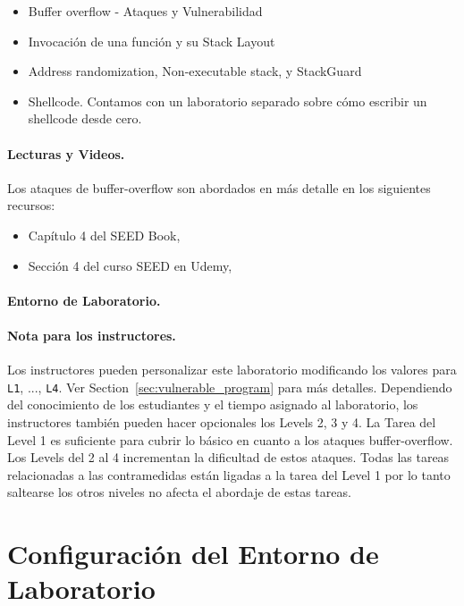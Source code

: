 \begin{itemize}[noitemsep]
\item Buffer overflow - Ataques y Vulnerabilidad
\item Invocación de una función y su Stack Layout
\item Address randomization, Non-executable stack, y  StackGuard
\item Shellcode. Contamos con un laboratorio separado sobre cómo escribir un shellcode desde cero.
\end{itemize}



\paragraph{Lecturas y Videos.}
Los ataques de buffer-overflow son abordados en más detalle en los siguientes recursos:

\begin{itemize}
\item Capítulo 4 del SEED Book, \seedbook
\item Sección 4 del curso SEED en Udemy, \seedcsvideo
\end{itemize}


\paragraph{Entorno de Laboratorio.} \seedenvironmentC


\paragraph{Nota para los instructores.}
Los instructores pueden personalizar este laboratorio modificando los valores para \texttt{L1}, ..., \texttt{L4}. Ver Section~\ref{sec:vulnerable_program} para más detalles.
Dependiendo del conocimiento de los estudiantes y el tiempo asignado al laboratorio, los instructores también pueden hacer opcionales los Levels 2, 3 y 4.
La Tarea del Level 1 es suficiente para cubrir lo básico en cuanto a los ataques buffer-overflow. Los Levels del 2 al 4 incrementan la dificultad de estos ataques.
Todas las tareas relacionadas a las contramedidas están ligadas a la tarea del Level 1 por lo tanto saltearse los otros niveles no afecta el abordaje de estas tareas.


\section{Configuración del Entorno de Laboratorio} 

